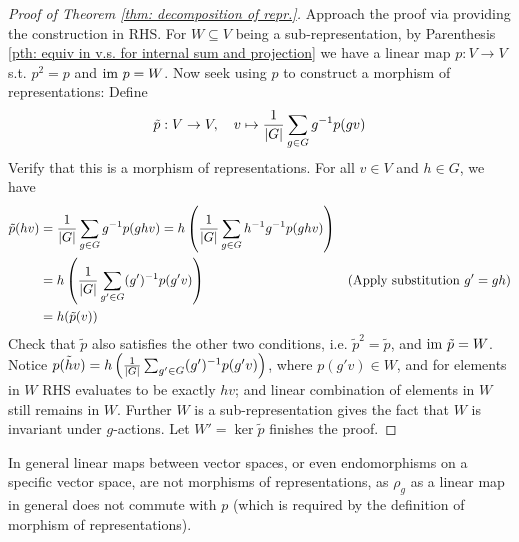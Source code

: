 \documentclass{article}
\begin{document}
\begin{proof}[Proof of Theorem \ref{thm: decomposition of repr.}]
    Approach the proof via providing the construction in RHS. For $W \subseteq V$ being a sub-representation, by Parenthesis \ref{pth: equiv in v.s. for internal sum and projection} we have a linear map $p: V \to V$ s.t. $p^2 = p$ and $\mathrm{im}\  p = W$. Now seek using $p$ to construct a morphism of representations: Define 
    \[
        \tilde{p}: V \to V, \quad v \mapsto \frac{1}{\left|G\right|} \sum_{g \in G} g^{-1} p(gv)
    \]
    Verify that this is a morphism of representations. For all $v \in V$ and $h \in G$, we have
    \begin{align*}
        \tilde{p}(hv)
        & = \frac{1}{\left|G\right|} \sum_{g \in G} g^{-1} p(ghv) = h \left( \frac{1}{\left|G\right|} \sum_{g \in G} h^{-1} g^{-1} p(ghv) \right) \\
        & = h\left(\frac{1}{\left|G\right|} \sum_{g' \in G} (g')^{-1} p(g'v) \right) & (\text{Apply substitution $g' = gh$}) \\
        & = h(\tilde{p}(v))
    \end{align*}
    Check that $\tilde{p}$ also satisfies the other two conditions, i.e. $\tilde{p}^2 = \tilde{p}$, and $\mathrm{im}\  \tilde{p} = W$. Notice $\tilde{p(hv)} = h\left(\frac{1}{\left|G\right|} \sum_{g' \in G} (g')^{-1} p(g'v) \right)$, where $p(g'v) \in W$, and for elements in $W$ RHS evaluates to be exactly $hv$; and linear combination of elements in $W$ still remains in $W$. Further $W$ is a sub-representation gives the fact that $W$ is invariant under $g$-actions. Let $W' = \ker \tilde{p}$ finishes the proof.
\end{proof}

\begin{remark}
    In general linear maps between vector spaces, or even endomorphisms on a specific vector space, are not morphisms of representations, as $\rho_g$ as a linear map in general does not commute with $p$ (which is required by the definition of morphism of representations).
\end{remark}
\end{document}
